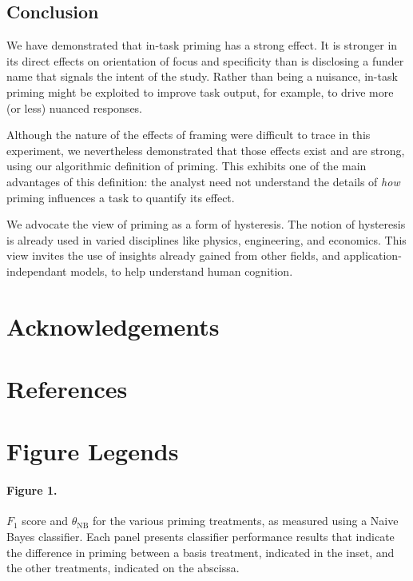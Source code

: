 \documentclass[a4paper]{report}
\begin{document}
\subsection*{Conclusion}
We have demonstrated that in-task priming has a strong effect.  It is stronger
in its direct effects on orientation of focus and specificity than is 
disclosing a funder name that signals the intent of the study.  
Rather than being a nuisance, in-task priming might be exploited to improve
task output, for example, to drive more (or less) nuanced responses.

Although the nature of the effects of framing were difficult to trace
in this experiment, we nevertheless demonstrated that those effects exist
and are strong, using our algorithmic definition of priming.  This exhibits
one of the main advantages of this definition: the analyst need 
not understand the details of \textit{how} priming influences a task to 
quantify its effect.

We advocate the view of priming as a form of hysteresis.  The notion of 
hysteresis is already used in varied disciplines like physics, engineering,
and economics.  This view invites the use of insights already gained from 
other fields, and application-independant models, to help understand human 
cognition.

\section*{Acknowledgements}
\section*{References}
\begingroup
\renewcommand{\chapter}[2]{}

\endgroup
 

\section*{Figure Legends}
\paragraph{Figure 1.}
$F_1$ score and $\theta_\text{NB}$ for the various 
priming treatments, as measured using a Naive Bayes classifier. Each panel 
presents classifier performance results that indicate the difference in
priming between a basis 
treatment, indicated in the inset, and the other treatments, indicated on the
abscissa.
\end{document}

